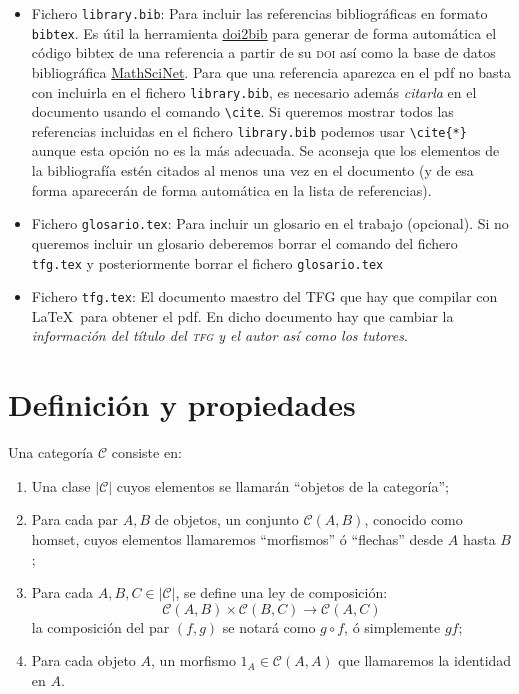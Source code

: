 \begin{itemize}
  \item Fichero \texttt{library.bib}: Para incluir las referencias bibliográficas en formato \texttt{bibtex}. Es útil la herramienta \href{https://www.doi2bib.org/}{doi2bib} para generar de forma automática el código bibtex de una referencia a partir de su \textsc{doi}  así como la base de datos bibliográfica \href{https://mathscinet.ams.org}{MathSciNet}. Para que una referencia aparezca en el pdf no basta con incluirla en el fichero \texttt{library.bib}, es necesario además \emph{citarla} en el documento usando el comando \verb+\cite+. Si queremos mostrar todos las referencias incluidas en el fichero \texttt{library.bib} podemos usar \verb+\cite{*}+ aunque esta opción no es la más adecuada. Se aconseja que los elementos de la bibliografía estén citados al menos una vez en el documento (y de esa forma aparecerán de forma automática en la lista de referencias).

  \item Fichero \texttt{glosario.tex}: Para incluir un glosario en el trabajo (opcional). Si no queremos incluir un glosario deberemos borrar el comando \verb++ del fichero \texttt{tfg.tex} y posteriormente borrar el fichero \texttt{glosario.tex}

   \item Fichero \texttt{tfg.tex}: El documento maestro del TFG que hay que compilar con \LaTeX\ para obtener el pdf. En dicho documento hay que cambiar la \emph{información del título del \textsc{tfg} y el autor así como los tutores}.
\end{itemize}

\section{Definición y propiedades}

\begin{definicion}\label{def_categoria}
    Una categoría $\mathscr{C}$ consiste en:
    \begin{enumerate}
        \item Una clase $|\mathscr{C}|$ cuyos elementos se llamarán ``objetos de la categoría'';
        \item Para cada par $A,B$ de objetos, un conjunto $\mathscr{C}(A,B)$, conocido como homset, cuyos elementos llamaremos ``morfismos'' ó ``flechas'' desde $A$ hasta $B$;
        \item Para cada $A,B,C \in |\mathscr{C}|$, se define una ley de composición:
            \begin{equation}
                \mathscr{C}(A,B) \times \mathscr{C}(B,C) \longrightarrow \mathscr{C}(A,C)
            \end{equation}
        la composición del par $(f,g)$ se notará como $g\circ f$, ó simplemente $gf$;
        \item Para cada objeto $A$, un morfismo $1_{A} \in \mathscr{C}(A,A)$ que llamaremos la identidad en $A$.
    \end{enumerate}
\end{definicion}

